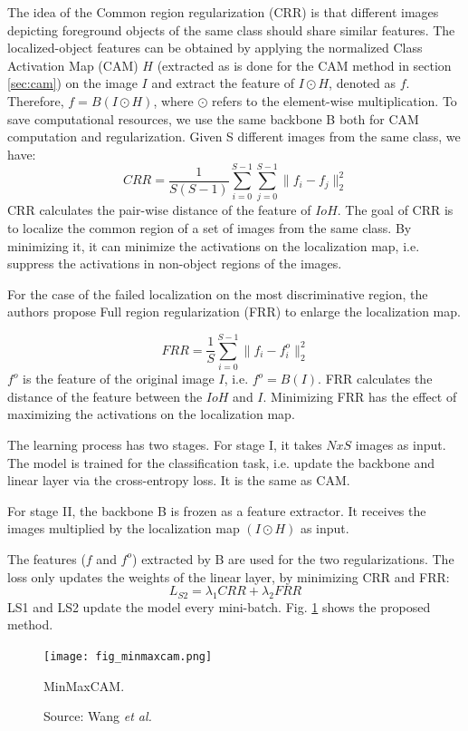 The idea of the Common region regularization (CRR) is that different images depicting foreground objects of the same class should share similar features. The localized-object features can be obtained by applying the normalized Class Activation Map (CAM) $H$ (extracted as is done for the CAM method in section \ref{sec:cam}) on the image $I$ and extract the feature of $I \odot H$, denoted as $f$. Therefore, $f = B(I \odot H)$, where $\odot$ refers to the element-wise multiplication. To save computational resources, we use the same backbone B both for CAM computation and regularization. Given S different images from the same class, we have:
\begin{equation}
    CRR = \frac{1}{S(S-1)} \sum^{S-1}_{i=0} \sum^{S-1}_{j=0} \lVert f_i - f_j \rVert^2_2
\end{equation}
CRR calculates the pair-wise distance of the feature of $IoH$. The goal of CRR is to localize the common region of a set of images from the same class. By minimizing it, it can minimize the activations on the localization map, i.e. suppress the activations in non-object regions of the images.

For the case of the failed localization on the most discriminative region, the authors propose Full region regularization (FRR) to enlarge the localization map.

\begin{equation}
    FRR = \frac{1}{S} \sum^{S-1}_{i=0}\lVert f_i - f^o_i \rVert^2_2
\end{equation}
$f^o$ is the feature of the original image $I$, i.e. $f^o=B(I)$. FRR calculates the distance of the feature between the $IoH$ and $I$. Minimizing FRR has the effect of maximizing the activations on the localization map.

The learning process has two stages. For stage I, it takes $N x S$ images as input. The model is trained for the classification task, i.e. update the backbone and linear layer via the cross-entropy loss. It is the same as CAM.

For stage II, the backbone B is frozen as a feature extractor. It receives the images multiplied by the localization map $(I \odot H)$ as input.

The features ($f$ and $f^o$) extracted by B are used for the two regularizations. The loss only updates the weights of the linear layer, by minimizing CRR and FRR:
\begin{equation}
    L_{S2} = \lambda_{1}CRR + \lambda_{2}FRR
\end{equation} 
LS1 and LS2 update the model every mini-batch. Fig. \ref{fig:minmaxcam} shows the proposed method.
\begin{figure}[ht]
    \begin{center}       
    \texttt{[image: fig\_minmaxcam.png]}
    \caption[MinMaxCAM]{MinMaxCAM.}
    \caption*{Source: Wang \textit{et al.} \cite{wang2021minmaxcam}}
    \label{fig:minmaxcam}
    \end{center}
\end{figure}

